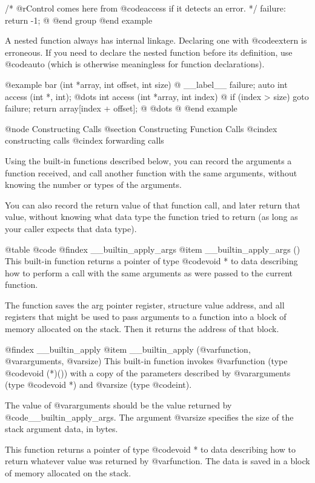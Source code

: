 {{ /* @r{Control comes here from @code{access}
    if it detects an error.}  */
 failure:
  return -1;
@}
@end group
@end example

A nested function always has internal linkage.  Declaring one with
@code{extern} is erroneous.  If you need to declare the nested function
before its definition, use @code{auto} (which is otherwise meaningless
for function declarations).

@example
bar (int *array, int offset, int size)
@{
  __label__ failure;
  auto int access (int *, int);
  @dots{}
  int access (int *array, int index)
    @{
      if (index > size)
        goto failure;
      return array[index + offset];
    @}
  @dots{}
@}
@end example

@node Constructing Calls
@section Constructing Function Calls
@cindex constructing calls
@cindex forwarding calls

Using the built-in functions described below, you can record
the arguments a function received, and call another function
with the same arguments, without knowing the number or types
of the arguments.

You can also record the return value of that function call,
and later return that value, without knowing what data type
the function tried to return (as long as your caller expects
that data type).

@table @code
@findex __builtin_apply_args
@item __builtin_apply_args ()
This built-in function returns a pointer of type @code{void *} to data
describing how to perform a call with the same arguments as were passed
to the current function.

The function saves the arg pointer register, structure value address,
and all registers that might be used to pass arguments to a function
into a block of memory allocated on the stack.  Then it returns the
address of that block.

@findex __builtin_apply
@item __builtin_apply (@var{function}, @var{arguments}, @var{size})
This built-in function invokes @var{function} (type @code{void (*)()})
with a copy of the parameters described by @var{arguments} (type
@code{void *}) and @var{size} (type @code{int}).

The value of @var{arguments} should be the value returned by
@code{__builtin_apply_args}.  The argument @var{size} specifies the size
of the stack argument data, in bytes.

This function returns a pointer of type @code{void *} to data describing
how to return whatever value was returned by @var{function}.  The data
is saved in a block of memory allocated on the stack.

}
